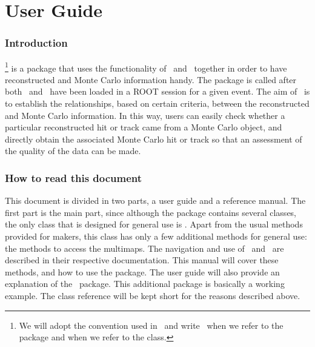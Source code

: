 %
%
\tableofcontents
\cleardoublepage

%
%
\part{User Guide}
\clearpage


\section{Introduction}

\StAssociationMaker\footnote{We will adopt the convention used in \StEvent\ 
    and write \StMcEvent\ when we refer to the package and
     when we refer to the class.} is a package that
uses the functionality of \StEvent\ and \StMcEvent\ together in order
to have reconstructed and Monte Carlo information handy.
The package is called after both \StEvent\ and \StMcEvent\ have been loaded
in a ROOT session for a given event.  
The aim of \StAssociationMaker\ is to establish the relationships, based
on certain criteria, between the reconstructed and Monte Carlo information.
In this way,
users can easily check whether a particular reconstructed hit or
track came from a Monte Carlo object, and directly obtain the associated Monte
Carlo hit or track so that an assessment of the quality of the
data can be made.

\clearpage


\section{How to read this document}

This document is divided in two parts, a user guide and a
reference manual. The first part is the main part, since although
the package contains several classes, the only class that is designed
for general use is \name{StAssociationMaker}.  Apart from the usual
methods provided for makers, this class has only a few additional methods
for general use: the methods to access the multimaps.  The navigation and
use of \StEvent\ and \StMcEvent\ are described in their respective
documentation.
This manual will cover these methods, and how to
use the package.  The user guide will also provide an explanation of
the \StMcAnalysisMaker\ package.  This additional package is basically
a working example.  The class reference will be kept short for the
reasons described above.

